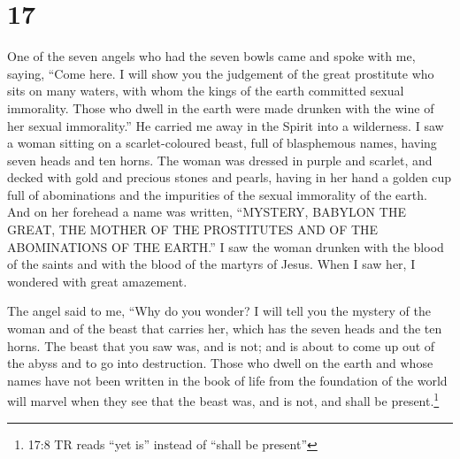 \hypertarget{section-16}{%
\section{17}\label{section-16}}

 One of the seven angels who had the seven bowls came and
spoke with me, saying, ``Come here. I will show you the judgement of the
great prostitute who sits on many waters,  with whom the
kings of the earth committed sexual immorality. Those who dwell in the
earth were made drunken with the wine of her sexual immorality.''
 He carried me away in the Spirit into a wilderness. I saw a
woman sitting on a scarlet-coloured beast, full of blasphemous names,
having seven heads and ten horns.  The woman was dressed in
purple and scarlet, and decked with gold and precious stones and pearls,
having in her hand a golden cup full of abominations and the impurities
of the sexual immorality of the earth.  And on her forehead
a name was written, ``MYSTERY, BABYLON THE GREAT, THE MOTHER OF THE
PROSTITUTES AND OF THE ABOMINATIONS OF THE EARTH.''  I saw
the woman drunken with the blood of the saints and with the blood of the
martyrs of Jesus. When I saw her, I wondered with great amazement.

 The angel said to me, ``Why do you wonder? I will tell you
the mystery of the woman and of the beast that carries her, which has
the seven heads and the ten horns.  The beast that you saw
was, and is not; and is about to come up out of the abyss and to go into
destruction. Those who dwell on the earth and whose names have not been
written in the book of life from the foundation of the world will marvel
when they see that the beast was, and is not, and shall be
present.\footnote{17:8 TR reads ``yet is'' instead of ``shall be
  present''}

